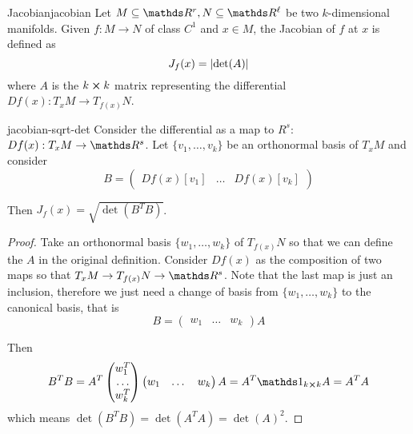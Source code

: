 \documentclass[12pt]{extarticle}
\begin{document}
\begin{definition}{Jacobian}{jacobian}
	Let $M \subseteq \R^r, N \subseteq \R^\ell$ be two $k$-dimensional manifolds.
	Given $f: M \to N$ of class $C^1$ and $x \in M$, the Jacobian of $f$ at $x$ is defined as
	\begin{equation}
		J_f(x) = \abs{\det(A)}
	\end{equation}
	where $A$ is the $k\cross k$ matrix representing the differential $Df(x): T_x M \to T_{f(x)} N$.
\end{definition}

\begin{proposition}{}{jacobian-sqrt-det}
	Consider the differential as a map to $R^s$: $Df(x): T_x M \to \R^s$.
	Let $\{v_1, \dots, v_k\}$ be an orthonormal basis of $T_x M$ and consider
	\begin{equation}
		B = \begin{pmatrix}
			Df(x) [v_1] & \dots & Df(x) [v_k]
		\end{pmatrix}
	\end{equation}

	Then $J_f(x) = \sqrt{\det(B^T B)}$.
\end{proposition}

\begin{proof}
	Take an orthonormal basis $\{w_1, \dots, w_k \}$ of $T_{f(x)} N$ so that we can define the $A$ in
	the original definition.
	Consider $Df(x)$ as the composition of two maps so that $T_x M \to T_{f(x)} N \to \R^s$.
	Note that the last map is just an inclusion, therefore we just need a change of basis from
	$\{w_1, \dots, w_k\}$ to the canonical basis, that is
	\begin{equation}
		B =
		\begin{pmatrix}
			w_1 & \dots & w_k
		\end{pmatrix} A
	\end{equation}

	Then
	\begin{equation}
		B^T B = A^T \begin{pmatrix} w_1^T \\ \dots \\ w_k^T \end{pmatrix}
		\begin{pmatrix} w_1 & \dots & w_k \end{pmatrix} A
		= A^T \mathds 1_{k \cross k} A = A^T A
	\end{equation}
	which means $\det(B^T B) = \det(A^T A) = \det(A)^2$.
\end{proof}
\end{document}
